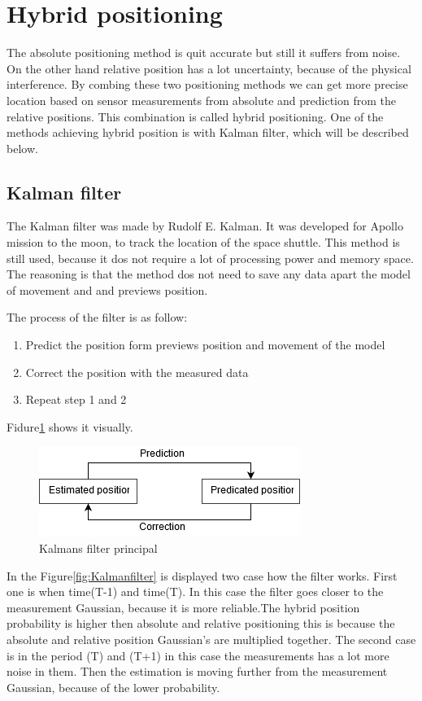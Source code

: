 \section{Hybrid positioning}

The absolute positioning method is quit accurate but still it suffers from noise. On the other hand relative position has a lot uncertainty, because of the physical interference. By combing these two positioning methods we can get more precise location based on sensor measurements from absolute and prediction from the relative positions. This combination is called hybrid positioning. One of the methods achieving hybrid position is with Kalman filter, which will be described below.

\subsection{Kalman filter}

The Kalman filter was made by Rudolf E. Kalman. It was developed for Apollo mission to the moon, to track the location of the space shuttle. This method is still used, because it dos not require a lot of processing power and memory space. The reasoning is that the method dos not need to save any data apart the model of movement and and previews position.

The process of the filter is as follow:
\begin{enumerate}
	\item Predict the position form previews position and movement of the model
	\item Correct the position with the measured data
	\item Repeat step 1 and 2
\end{enumerate}

Fidure\ref{fig:KalmanfilterRotation} shows it visually.

\begin{figure}[H]
	\centering
	\includegraphics[width=0.4\linewidth]{positioning/positioning/KalmanFilterProcess}
	\caption{Kalmans filter principal}
	\label{fig:KalmanfilterRotation}
\end{figure}

In the Figure\ref{fig:Kalmanfilter} is displayed two case how the filter works. First one is when time(T-1) and time(T). In this case the filter goes closer to the measurement Gaussian, because it is more reliable.The hybrid position probability is higher then absolute and relative positioning this is because the absolute and relative position Gaussian's are multiplied together. The second case is in the period (T) and (T+1) in this case the measurements has a lot more noise in them. Then the estimation is moving further from the measurement Gaussian, because of the lower probability. 


